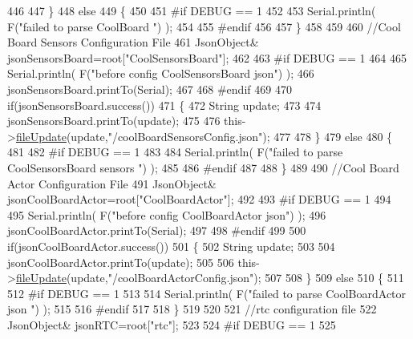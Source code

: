 \begin{DoxyCode}
446         
447     \}
448     \textcolor{keywordflow}{else}
449     \{
450     
451 \textcolor{preprocessor}{    #if DEBUG == 1 }
452 
453         Serial.println( F(\textcolor{stringliteral}{"failed to parse CoolBoard "}) );
454     
455 \textcolor{preprocessor}{    #endif}
456 
457     \}       
458 
459     
460     \textcolor{comment}{//Cool Board Sensors Configuration File}
461         JsonObject& jsonSensorsBoard=root[\textcolor{stringliteral}{"CoolSensorsBoard"}];
462 
463 \textcolor{preprocessor}{#if DEBUG == 1 }
464 
465     Serial.println( F(\textcolor{stringliteral}{"before config CoolSensorsBoard json"}) );
466     jsonSensorsBoard.printTo(Serial);
467 
468 \textcolor{preprocessor}{#endif }
469     
470     \textcolor{keywordflow}{if}(jsonSensorsBoard.success())
471     \{   
472         String update;
473     
474         jsonSensorsBoard.printTo(update);
475 
476         this->\hyperlink{class_cool_file_system_a13f2958f5b87757c31fc53797a30d23a}{fileUpdate}(update,\textcolor{stringliteral}{"/coolBoardSensorsConfig.json"});      
477 
478     \}
479     \textcolor{keywordflow}{else}
480     \{
481 
482 \textcolor{preprocessor}{    #if DEBUG == 1}
483 
484         Serial.println( F(\textcolor{stringliteral}{"failed to parse CoolSensorsBoard sensors "}) );   
485     
486 \textcolor{preprocessor}{    #endif}
487 
488     \}
489 
490     \textcolor{comment}{//Cool Board Actor Configuration File}
491         JsonObject& jsonCoolBoardActor=root[\textcolor{stringliteral}{"CoolBoardActor"}];
492 
493 \textcolor{preprocessor}{#if DEBUG == 1 }
494 
495     Serial.println( F(\textcolor{stringliteral}{"before config CoolBoardActor json"}) );
496     jsonCoolBoardActor.printTo(Serial);
497 
498 \textcolor{preprocessor}{#endif }
499     
500     \textcolor{keywordflow}{if}(jsonCoolBoardActor.success())
501     \{   
502         String update;
503     
504         jsonCoolBoardActor.printTo(update);
505 
506         this->\hyperlink{class_cool_file_system_a13f2958f5b87757c31fc53797a30d23a}{fileUpdate}(update,\textcolor{stringliteral}{"/coolBoardActorConfig.json"});        
507 
508     \}
509     \textcolor{keywordflow}{else}
510     \{
511 
512 \textcolor{preprocessor}{    #if DEBUG == 1}
513 
514         Serial.println( F(\textcolor{stringliteral}{"failed to parse CoolBoardActor json "}) );    
515     
516 \textcolor{preprocessor}{    #endif}
517 
518     \}
519 
520     
521     \textcolor{comment}{//rtc configuration file}
522         JsonObject& jsonRTC=root[\textcolor{stringliteral}{"rtc"}];
523 
524 \textcolor{preprocessor}{#if DEBUG == 1 }
525     

\end{DoxyCode}
